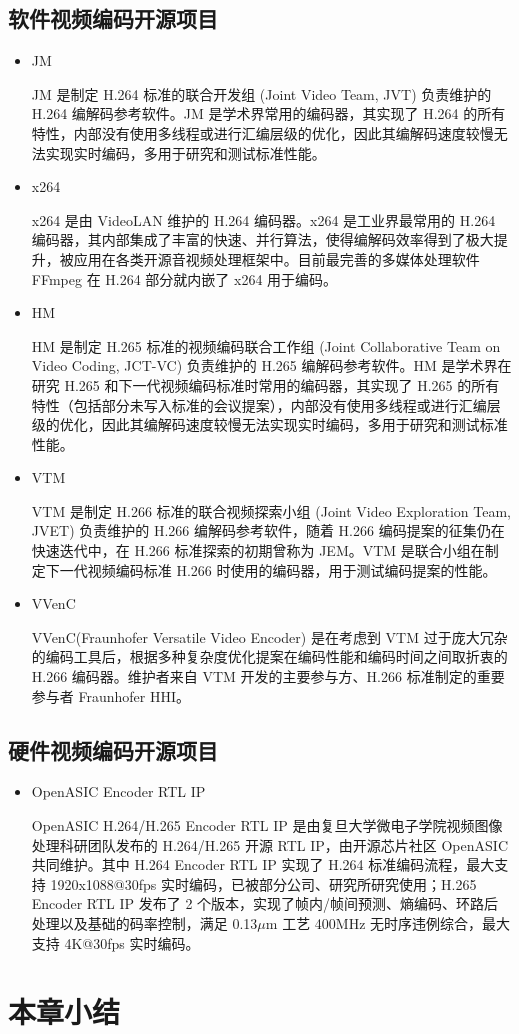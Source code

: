 \subsection{软件视频编码开源项目}
\begin{itemize}
    \item JM

    JM 是制定 H.264 标准的联合开发组 (Joint Video Team, JVT) 负责维护的 H.264 编解码参考软件。JM 是学术界常用的编码器，其实现了 H.264 的所有特性，内部没有使用多线程或进行汇编层级的优化，因此其编解码速度较慢无法实现实时编码，多用于研究和测试标准性能。

    \item x264

    x264 是由 VideoLAN 维护的 H.264 编码器。x264 是工业界最常用的 H.264 编码器，其内部集成了丰富的快速、并行算法，使得编解码效率得到了极大提升，被应用在各类开源音视频处理框架中。目前最完善的多媒体处理软件 FFmpeg 在 H.264 部分就内嵌了 x264 用于编码。

    \item HM

    HM 是制定 H.265 标准的视频编码联合工作组 (Joint Collaborative Team on Video Coding, JCT-VC) 负责维护的 H.265 编解码参考软件。HM 是学术界在研究 H.265 和下一代视频编码标准时常用的编码器，其实现了 H.265 的所有特性（包括部分未写入标准的会议提案），内部没有使用多线程或进行汇编层级的优化，因此其编解码速度较慢无法实现实时编码，多用于研究和测试标准性能。

    \item VTM

    VTM 是制定 H.266 标准的联合视频探索小组 (Joint Video Exploration Team, JVET) 负责维护的 H.266 编解码参考软件，随着 H.266 编码提案的征集仍在快速迭代中，在 H.266 标准探索的初期曾称为 JEM。VTM 是联合小组在制定下一代视频编码标准 H.266 时使用的编码器，用于测试编码提案的性能。

    \item VVenC
    
    VVenC(Fraunhofer Versatile Video Encoder) 是在考虑到 VTM 过于庞大冗杂的编码工具后，根据多种复杂度优化提案在编码性能和编码时间之间取折衷的 H.266 编码器。维护者来自 VTM 开发的主要参与方、H.266 标准制定的重要参与者 Fraunhofer HHI。
\end{itemize}

\subsection{硬件视频编码开源项目}
\begin{itemize}
    \item OpenASIC Encoder RTL IP

    OpenASIC H.264/H.265 Encoder RTL IP 是由复旦大学微电子学院视频图像处理科研团队发布的 H.264/H.265 开源 RTL IP，由开源芯片社区 OpenASIC 共同维护。其中 H.264 Encoder RTL IP 实现了 H.264 标准编码流程，最大支持 1920x1088@30fps 实时编码，已被部分公司、研究所研究使用；H.265 Encoder RTL IP 发布了 2 个版本，实现了帧内/帧间预测、熵编码、环路后处理以及基础的码率控制，满足 0.13$\mu$m 工艺 400MHz 无时序违例综合，最大支持 4K@30fps 实时编码。
\end{itemize}

\section{本章小结}